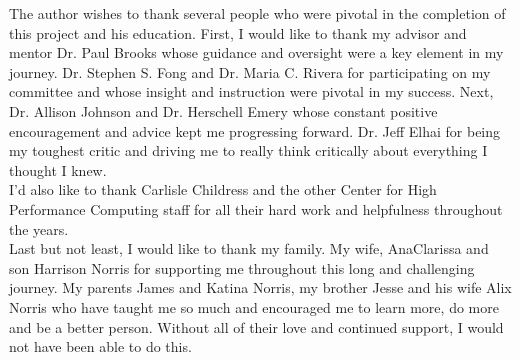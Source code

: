\documentclass[
12pt, %
english, %
singlespacing, %
headsepline, %
]{MastersDoctoralThesis} %
\begin{document}
\begin{acknowledgements}
\addchaptertocentry{\acknowledgementname} %
\doublespacing
\indent\indent The author wishes to thank several people who were pivotal in the completion of this project and his education. First, I would like to thank my advisor and mentor Dr. Paul Brooks whose guidance and oversight were a key element in my journey. Dr. Stephen S. Fong and Dr. Maria C. Rivera for participating on my committee and whose insight and instruction were pivotal in my success. Next, Dr. Allison Johnson and Dr. Herschell Emery whose constant positive encouragement and advice kept me progressing forward. Dr. Jeff Elhai for being my toughest critic and driving me to really think critically about everything I thought I knew.\\
\indent I'd also like to thank Carlisle Childress and the other Center for High Performance Computing staff for all their hard work and helpfulness throughout the years.\\
\indent Last but not least, I would like to thank my family. My wife, AnaClarissa and son Harrison Norris for supporting me throughout this long and challenging journey. My parents James and Katina Norris, my brother Jesse and his wife Alix Norris who have taught me so much and encouraged me to learn more, do more and be a better person. Without all of their love and continued support, I would not have been able to do this.

\end{acknowledgements}

\doublespacing
\tableofcontents %
\doublespacing
\listoffigures %
\doublespacing
\listoftables %



\end{document}
